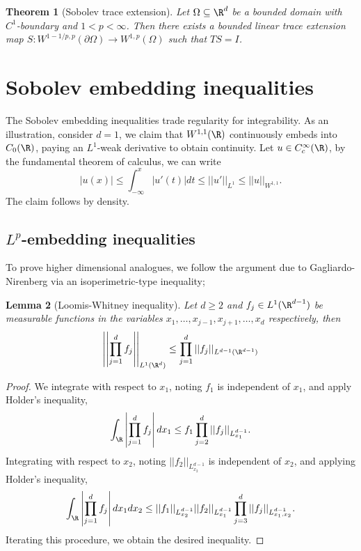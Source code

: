 \documentclass[reqno]{amsart}
\newtheorem{theorem}{Theorem}
\newtheorem{lemma}[theorem]{Lemma}
\theoremstyle{definition}
\theoremstyle{remark}
\begin{document}
\begin{theorem}[Sobolev trace extension]
	Let $\Omega \subseteq \R^d$ be a bounded domain with $C^1$-boundary and $1 < p < \infty$. Then there exists a bounded linear trace extension map $S: W^{1 - 1/p, p} (\partial\Omega) \to W^{1,p} (\Omega)$ such that $TS = I$. 
\end{theorem}

\section{Sobolev embedding inequalities}

The Sobolev embedding inequalities trade regularity for integrability. As an illustration, consider $d = 1$, we claim that $W^{1, 1} (\R)$ continuously embeds into $C_0 (\R)$, paying an $L^1$-weak derivative to obtain continuity. Let $u \in C^\infty_c (\R)$, by the fundamental theorem of calculus, we can write
	\[ |u(x)| \leq \int_{-\infty}^x |u' (t)| dt \leq ||u'||_{L^1} \leq ||u||_{W^{1, 1}}. \]
The claim follows by density. 

\subsection{$L^p$-embedding inequalities}

To prove higher dimensional analogues, we follow the argument due to Gagliardo-Nirenberg via an isoperimetric-type inequality;
	

\begin{lemma}[Loomis-Whitney inequality]
	Let $d \geq 2$ and $f_j \in L^1 (\R^{d - 1})$ be measurable functions in the variables $x_1, \dots, x_{j - 1}, x_{j + 1}, \dots, x_d$ respectively, then 
		\[ \left|\left| \prod_{j = 1}^d f_j \right|\right|_{L^1 (\R^d)} \leq \prod_{j = 1}^d ||f_j||_{L^{d - 1} (\R^{d - 1})} \]
\end{lemma}

\begin{proof}
	We integrate with respect to $x_1$, noting $f_1$ is independent of $x_1$, and apply Holder's inequality,
		\[ \int_{\R} \left|\prod_{j  =1 }^d f_j\right| dx_1 \leq f_1 \prod_{j = 2}^d ||f_j||_{L^{d - 1}_{x_1}}. \]
	Integrating with respect to $x_2$, noting $||f_2||_{L^{d - 1}_{x_2}}$ is independent of $x_2$, and applying Holder's inequality, 
		\[ \int_{\R} \left|\prod_{j  =1 }^d f_j \right| dx_1 dx_2 \leq ||f_1||_{L^{d - 1}_{x_2}} ||f_2||_{L^{d - 1}_{x_1}} \prod_{j = 3}^d ||f_j||_{L^{d - 1}_{x_1, x_2}} .\]
	Iterating this procedure, we obtain the desired inequality. 
\end{proof}
\end{document}
